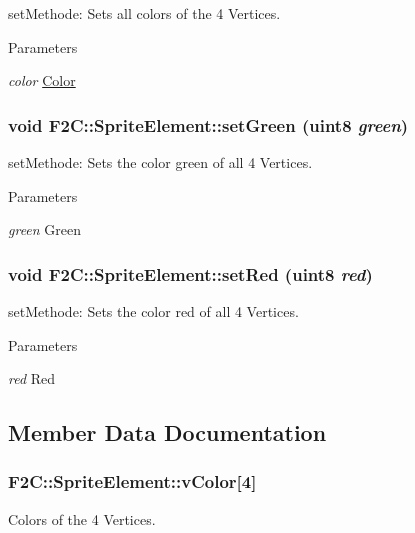 setMethode: Sets all colors of the 4 Vertices. 
\begin{DoxyParams}{Parameters}
\item[{\em color}]\hyperlink{class_f2_c_1_1_color}{Color} \end{DoxyParams}
\hypertarget{class_f2_c_1_1_sprite_element_a8ab0a68bd984814a81afec23fa250bfc}{
\subsubsection[{setGreen}]{\setlength{\rightskip}{0pt plus 5cm}void F2C::SpriteElement::setGreen ({\bf uint8} {\em green})}}
\label{class_f2_c_1_1_sprite_element_a8ab0a68bd984814a81afec23fa250bfc}


setMethode: Sets the color green of all 4 Vertices. 
\begin{DoxyParams}{Parameters}
\item[{\em green}]Green \end{DoxyParams}
\hypertarget{class_f2_c_1_1_sprite_element_a3a99ebcab976db9d2ccf759207ea534c}{
\subsubsection[{setRed}]{\setlength{\rightskip}{0pt plus 5cm}void F2C::SpriteElement::setRed ({\bf uint8} {\em red})}}
\label{class_f2_c_1_1_sprite_element_a3a99ebcab976db9d2ccf759207ea534c}


setMethode: Sets the color red of all 4 Vertices. 
\begin{DoxyParams}{Parameters}
\item[{\em red}]Red \end{DoxyParams}


\subsection{Member Data Documentation}
\hypertarget{class_f2_c_1_1_sprite_element_ad6fa2c39e687e33c0dd98b7003f048b9}{
\subsubsection[{vColor}]{ {\bf F2C::SpriteElement::vColor}\mbox{[}4\mbox{]}}}
\label{class_f2_c_1_1_sprite_element_ad6fa2c39e687e33c0dd98b7003f048b9}


Colors of the 4 Vertices.  